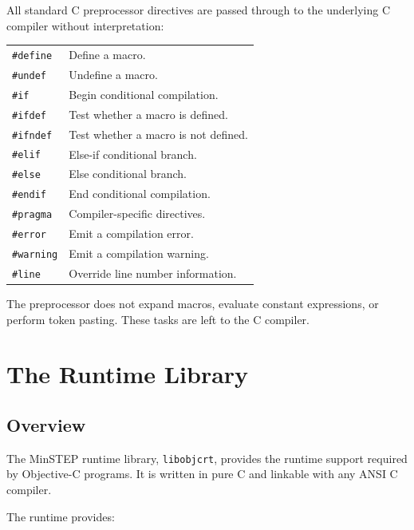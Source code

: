 \documentclass[11pt,twoside]{article}
\newcommand{\libobjcrt}{{\tt libobjcrt}}
\begin{document}
All standard C preprocessor directives are passed through to the
underlying C compiler without interpretation:

\medskip
\noindent
\begin{tabularx}{\textwidth}{lX}
{\tt \#define}   & Define a macro. \\
{\tt \#undef}    & Undefine a macro. \\
{\tt \#if}       & Begin conditional compilation. \\
{\tt \#ifdef}    & Test whether a macro is defined. \\
{\tt \#ifndef}   & Test whether a macro is not defined. \\
{\tt \#elif}     & Else-if conditional branch. \\
{\tt \#else}     & Else conditional branch. \\
{\tt \#endif}    & End conditional compilation. \\
{\tt \#pragma}   & Compiler-specific directives. \\
{\tt \#error}    & Emit a compilation error. \\
{\tt \#warning}  & Emit a compilation warning. \\
{\tt \#line}     & Override line number information. \\
\end{tabularx}

The preprocessor does not expand macros, evaluate constant expressions,
or perform token pasting.  These tasks are left to the C compiler.

\newpage
\section{The Runtime Library}

\subsection{Overview}

The MinSTEP runtime library, \libobjcrt, provides the runtime support
required by Objective-C programs.  It is written in pure C and linkable
with any ANSI C compiler.

The runtime provides:
\end{document}
